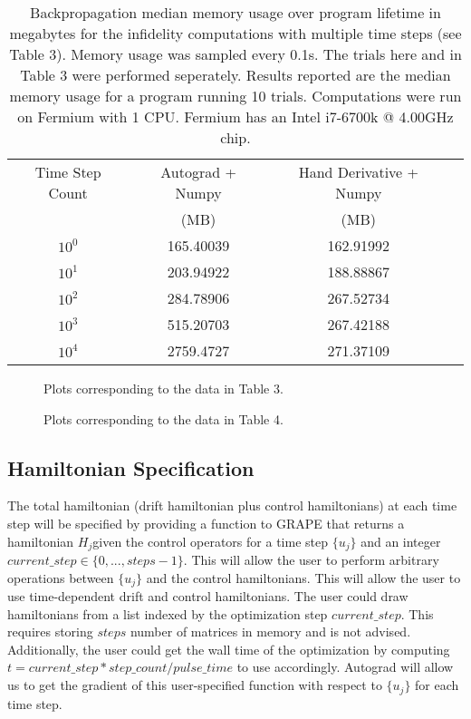 \documentclass[letterpaper, 12pt]{article}
\begin{document}
\begin{table}
  \begin{center}
    \begin{tabular}{c | c | c | c}
      Time Step Count & Autograd + Numpy & Hand Derivative + Numpy\\
                      & (MB)             & (MB)\\
      \hline
      $10^{0}$        & 165.40039        & 162.91992\\
      $10^{1}$        & 203.94922        & 188.88867\\
      $10^{2}$        & 284.78906        & 267.52734\\
      $10^{3}$        & 515.20703        & 267.42188\\
      $10^{4}$        & 2759.4727        & 271.37109\\
    \end{tabular}
  \end{center}
  \caption{Backpropagation median memory usage over program lifetime in megabytes for the infidelity computations with multiple time steps (see Table 3). Memory usage was sampled every 0.1s. The trials here and in Table 3 were performed seperately. Results reported are the median memory usage for a program running 10 trials. Computations were run on Fermium with 1 CPU. Fermium has an Intel i7-6700k @ 4.00GHz chip.}
\end{table}

\begin{figure}
  \caption{Plots corresponding to the data in Table 3.}
\end{figure}

\begin{figure}
  \caption{Plots corresponding to the data in Table 4.}
\end{figure}

\subsection{Hamiltonian Specification}
The total hamiltonian (drift hamiltonian plus control hamiltonians) at each time step will be specified by providing a function to GRAPE that returns a hamiltonian $H_{j}$given the control operators for a time step $\{u_{j}\}$ and an integer $current\_step \in \{0, ..., steps - 1\}$. This will allow the user to perform arbitrary operations between $\{u_{j}\}$ and the control hamiltonians. This will allow the user to use time-dependent drift and control hamiltonians. The user could draw hamiltonians from a list indexed by the optimization step $current\_step$. This requires storing $steps$ number of matrices in memory and is not advised. Additionally, the user could get the wall time of the optimization by computing $t = current\_step * step\_count / pulse\_time$ to use accordingly. Autograd will allow us to get the gradient of this user-specified function with respect to $\{u_{j}\}$ for each time step.
\end{document}
